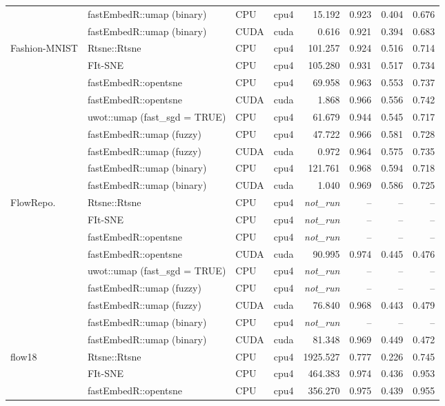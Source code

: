 {\begin{longtable}{p{}p{}llrrrr}
 & fastEmbedR::umap (binary) & CPU & cpu4 & 15.192 & 0.923 & 0.404 & 0.676\\
 & fastEmbedR::umap (binary) & CUDA & cuda & 0.616 & 0.921 & 0.394 & 0.683\\
\addlinespace[2pt]
Fashion-MNIST & Rtsne::Rtsne & CPU & cpu4 & 101.257 & 0.924 & 0.516 & 0.714\\
 & FIt-SNE & CPU & cpu4 & 105.280 & 0.931 & 0.517 & 0.734\\
 & fastEmbedR::opentsne & CPU & cpu4 & 69.958 & 0.963 & 0.553 & 0.737\\
 & fastEmbedR::opentsne & CUDA & cuda & 1.868 & 0.966 & 0.556 & 0.742\\
 & uwot::umap (fast\_sgd = TRUE) & CPU & cpu4 & 61.679 & 0.944 & 0.545 & 0.717\\
 & fastEmbedR::umap (fuzzy) & CPU & cpu4 & 47.722 & 0.966 & 0.581 & 0.728\\
 & fastEmbedR::umap (fuzzy) & CUDA & cuda & 0.972 & 0.964 & 0.575 & 0.735\\
 & fastEmbedR::umap (binary) & CPU & cpu4 & 121.761 & 0.968 & 0.594 & 0.718\\
 & fastEmbedR::umap (binary) & CUDA & cuda & 1.040 & 0.969 & 0.586 & 0.725\\
\addlinespace[2pt]
FlowRepo. & Rtsne::Rtsne & CPU & cpu4 & \textit{not\_run} & -- & -- & --\\
 & FIt-SNE & CPU & cpu4 & \textit{not\_run} & -- & -- & --\\
 & fastEmbedR::opentsne & CPU & cpu4 & \textit{not\_run} & -- & -- & --\\
 & fastEmbedR::opentsne & CUDA & cuda & 90.995 & 0.974 & 0.445 & 0.476\\
 & uwot::umap (fast\_sgd = TRUE) & CPU & cpu4 & \textit{not\_run} & -- & -- & --\\
 & fastEmbedR::umap (fuzzy) & CPU & cpu4 & \textit{not\_run} & -- & -- & --\\
 & fastEmbedR::umap (fuzzy) & CUDA & cuda & 76.840 & 0.968 & 0.443 & 0.479\\
 & fastEmbedR::umap (binary) & CPU & cpu4 & \textit{not\_run} & -- & -- & --\\
 & fastEmbedR::umap (binary) & CUDA & cuda & 81.348 & 0.969 & 0.449 & 0.472\\
\addlinespace[2pt]
flow18 & Rtsne::Rtsne & CPU & cpu4 & 1925.527 & 0.777 & 0.226 & 0.745\\
 & FIt-SNE & CPU & cpu4 & 464.383 & 0.974 & 0.436 & 0.953\\
 & fastEmbedR::opentsne & CPU & cpu4 & 356.270 & 0.975 & 0.439 & 0.955\\

\end{longtable}}
